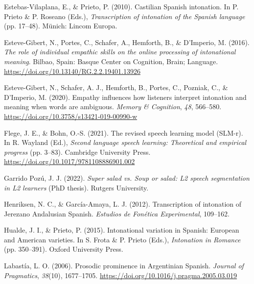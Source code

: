 \documentclass[]{article}
\newlength{\cslhangindent}
\newenvironment{CSLReferences}[2] %
 {%
  \setlength{\parindent}{0pt}
  \ifodd #1 \everypar{\setlength{\hangindent}{\cslhangindent}}\ignorespaces\fi
  \ifnum #2 > 0
  \setlength{\parskip}{#2\baselineskip}
  \fi
 }%
 {}
\begin{document}
\begin{CSLReferences}{1}{0}
\leavevmode{}%
Estebas-Vilaplana, E., \& Prieto, P. (2010). Castilian {S}panish intonation. In P. Prieto \& P. Roseano (Eds.), \emph{Transcription of intonation of the {S}panish language} (pp. 17--48). Münich: Lincom Europa.

\leavevmode{}%
Esteve-Gibert, N., Portes, C., Schafer, A., Hemforth, B., \& D'Imperio, M. (2016). \emph{The role of individual empathic skills on the online processing of intonational meaning}. Bilbao, Spain: Basque Center on Cognition, Brain; Language. \url{https://doi.org/10.13140/RG.2.2.19401.13926}

\leavevmode{}%
Esteve-Gibert, N., Schafer, A. J., Hemforth, B., Portes, C., Pozniak, C., \& D'Imperio, M. (2020). Empathy influences how listeners interpret intonation and meaning when words are ambiguous. \emph{Memory \& Cognition}, \emph{48}, 566--580. \url{https://doi.org/10.3758/s13421-019-00990-w}

\leavevmode{}%
Flege, J. E., \& Bohn, O.-S. (2021). The revised speech learning model (SLM-r). In R. Wayland (Ed.), \emph{Second language speech learning: Theoretical and empirical progress} (pp. 3--83). Cambridge University Press. \url{https://doi.org/10.1017/9781108886901.002}

\leavevmode{}%
Garrido Pozú, J. J. (2022). \emph{Super salad vs. Soup or salad: {L}2 speech segmentation in L2 learners} (PhD thesis). Rutgers University.

\leavevmode{}%
Henriksen, N. C., \& García-Amaya, L. J. (2012). Transcription of intonation of {J}erezano {A}ndalusian {S}panish. \emph{Estudios de {F}onética {E}xperimental}, 109--162.

\leavevmode{}%
Hualde, J. I., \& Prieto, P. (2015). Intonational variation in {S}panish: {E}uropean and {A}merican varieties. In S. Frota \& P. Prieto (Eds.), \emph{Intonation in {R}omance} (pp. 350--391). Oxford University Press.

\leavevmode{}%
Labastía, L. O. (2006). Prosodic prominence in {A}rgentinian {S}panish. \emph{Journal of Pragmatics}, \emph{38}(10), 1677--1705. \url{https://doi.org/10.1016/j.pragma.2005.03.019}


\end{CSLReferences}
\end{document}
